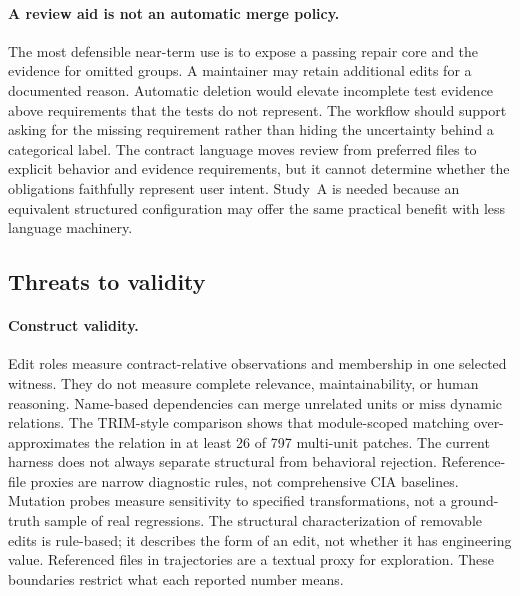 \documentclass[a4paper,fleqn]{cas-sc}
\begin{document}
\paragraph{A review aid is not an automatic merge policy.}
The most defensible near-term use is to expose a passing repair core and the evidence for omitted groups. A maintainer may retain additional edits for a documented reason. Automatic deletion would elevate incomplete test evidence above requirements that the tests do not represent. The workflow should support asking for the missing requirement rather than hiding the uncertainty behind a categorical label. The contract language moves review from preferred files to explicit behavior and evidence requirements, but it cannot determine whether the obligations faithfully represent user intent. Study~A is needed because an equivalent structured configuration may offer the same practical benefit with less language machinery.

\subsection{Threats to validity}\label{sec:validity}

\paragraph{Construct validity.}
Edit roles measure contract-relative observations and membership in one selected witness. They do not measure complete relevance, maintainability, or human reasoning. Name-based dependencies can merge unrelated units or miss dynamic relations. The TRIM-style comparison shows that module-scoped matching over-approximates the relation in at least 26 of 797 multi-unit patches. The current harness does not always separate structural from behavioral rejection. Reference-file proxies are narrow diagnostic rules, not comprehensive CIA baselines. Mutation probes measure sensitivity to specified transformations, not a ground-truth sample of real regressions. The structural characterization of removable edits is rule-based; it describes the form of an edit, not whether it has engineering value. Referenced files in trajectories are a textual proxy for exploration. These boundaries restrict what each reported number means.
\end{document}
